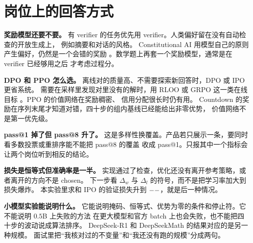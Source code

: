 \documentclass[10pt,twocolumn,a4paper]{ctexart}
\begin{document}
\section{岗位上的回答方式}
\textbf{奖励模型还要不要。}
有 verifier 的任务优先用 verifier。人类偏好留在没有自动检查的开放生成上，
例如摘要和对话的风格\citep{stiennon2020summarize,ouyang2022instructgpt}。
Constitutional AI 用模型自己的原则产生偏好，仍然是一个会错的奖励
\citep{bai2022constitutional}。数学题上再套一个奖励模型，通常是在 verifier 已经够用之后
才考虑过程分\citep{lightman2023verify}。

\textbf{DPO 和 PPO 怎么选。}
离线对的质量高、不需要探索新回答时，DPO 或 IPO 更省系统\citep{rafailov2023dpo,azar2024ipo}。
需要在采样里发现对里没有的解时，用 RLOO 或 GRPO 这一类在线目标
\citep{ahmadian2024rloo,shao2024deepseekmath}。PPO 的价值网络在奖励稠密、
信用分配很长时仍有用\citep{schulman2017ppo,zheng2023secrets}。
Countdown 的奖励在序列末尾才知道对错，四十步的组内基线已经能给出非零优势，
价值网络不是第一优先级。

\textbf{pass@1 掉了但 pass@8 升了。}
这是多样性换覆盖。产品若只展示一条，要同时看多数投票或重排序能不能把 pass@8 的覆盖
收成 pass@1。只报其中一个指标会让两个岗位听到相反的结论。

\textbf{损失是恒等式但准确率是一半。}
实现通过了检查，优化还没有离开参考策略，或者离开的方向不是 chosen。
下一步看 $\Delta_w$ 与 $\Delta_l$ 的符号，而不是把学习率加大到损失爆炸。
本实验里求和 IPO 的验证损失升到 $--$，就是后一种情况。

\textbf{小模型实验能说明什么。}
它能说明掩码、恒等式、优势为零的条件和停止符。它不能说明 $0.5$B 上失败的方法
在更大模型和官方 batch 上也会失败，也不能把四十步的波动说成算法排序。
DeepSeek-R1 和 DeepSeekMath 的结果对应的是另一种规模\citep{shao2024deepseekmath,deepseek2025r1,qwen2025qwen25}。
面试里把``我核对过的不变量''和``我还没有跑的规模''分成两句。



\end{document}
